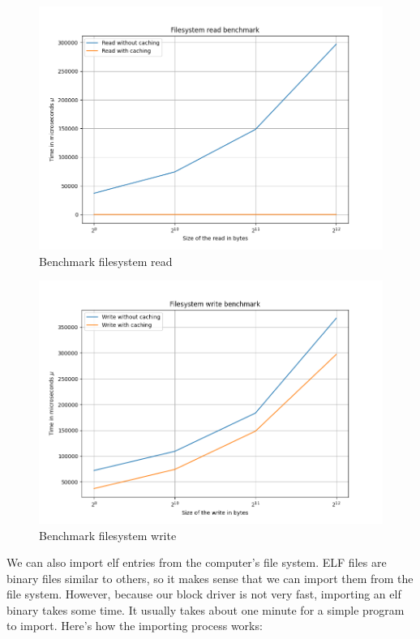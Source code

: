 {\begin{figure}[htp]
    \centering
    \includegraphics[width=12cm]{images/filesystem/filesystem_benchmark_read.png}
    \caption{Benchmark filesystem read}
    \label{fig:galaxy}
\end{figure}


\begin{figure}[htp]
    \centering
    \includegraphics[width=12cm]{images/filesystem/filesystem_benchmark_write.png}
    \caption{Benchmark filesystem write}
    \label{fig:galaxy}
\end{figure}

We can also import elf entries from the computer's file system. ELF files are binary files similar to others, so it makes sense that we can import them from the file system. However, because our block driver is not very fast, importing an elf binary takes some time. It usually takes about one minute for a simple program to import. Here's how the importing process works:

}
